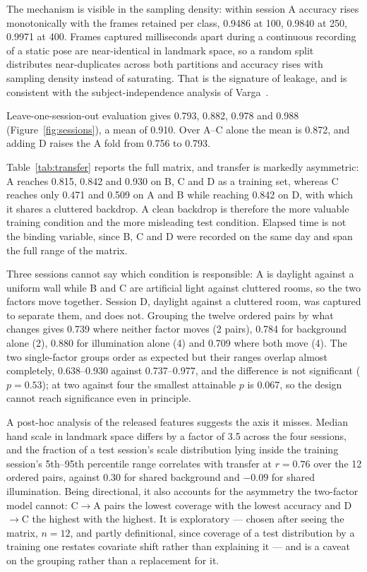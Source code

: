 \documentclass[conference]{IEEEtran}
\begin{document}
The mechanism is visible in the sampling density: within session A accuracy
rises monotonically with the frames retained per class, 0.9486 at 100, 0.9840 at
250, 0.9971 at 400. Frames captured milliseconds apart during a continuous
recording of a static pose are near-identical in landmark space, so a random
split distributes near-duplicates across both partitions and accuracy rises with
sampling density instead of saturating. That is the signature of leakage, and is
consistent with the subject-independence analysis of Varga~\cite{varga2026}.

Leave-one-session-out evaluation gives 0.793, 0.882, 0.978 and 0.988
(Figure~\ref{fig:sessions}), a mean of 0.910. Over A--C alone the mean is 0.872,
and adding D raises the A fold from 0.756 to 0.793.

Table~\ref{tab:transfer} reports the full matrix, and transfer is markedly
asymmetric: A reaches 0.815, 0.842 and 0.930 on B, C and D as a training set,
whereas C reaches only 0.471 and 0.509 on A and B while reaching 0.842 on D,
with which it shares a cluttered backdrop. A clean backdrop is therefore the
more valuable training condition and the more misleading test condition.
Elapsed time is not the binding variable, since B, C and D were recorded on the
same day and span the full range of the matrix.

Three sessions cannot say which condition is responsible: A is daylight against
a uniform wall while B and C are artificial light against cluttered rooms, so
the two factors move together. Session D, daylight against a cluttered room, was
captured to separate them, and does not. Grouping the twelve ordered pairs by
what changes gives 0.739 where neither factor moves (2 pairs), 0.784 for
background alone (2), 0.880 for illumination alone (4) and 0.709 where both move
(4). The two single-factor groups order as expected but their ranges overlap
almost completely, 0.638--0.930 against 0.737--0.977, and the difference is not
significant ($p=0.53$); at two against four the smallest attainable $p$ is
0.067, so the design cannot reach significance even in principle.

A post-hoc analysis of the released features suggests the axis it misses. Median
hand scale in landmark space differs by a factor of 3.5 across the four
sessions, and the fraction of a test session's scale distribution lying inside
the training session's 5th--95th percentile range correlates with transfer at
$r=0.76$ over the 12 ordered pairs, against 0.30 for shared background and
$-0.09$ for shared illumination. Being directional, it also accounts for the
asymmetry the two-factor model cannot: C$\rightarrow$A pairs the lowest coverage
with the lowest accuracy and D$\rightarrow$C the highest with the highest. It is
exploratory --- chosen after seeing the matrix, $n=12$, and partly definitional,
since coverage of a test distribution by a training one restates covariate shift
rather than explaining it --- and is a caveat on the grouping rather than a
replacement for it.
\end{document}
